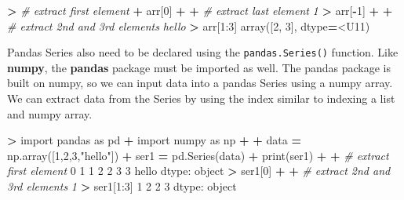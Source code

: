 \documentclass[
]{book}
\newenvironment{Shaded}{\begin{snugshade}}{\end{snugshade}}
\newcommand{\BuiltInTok}[1]{#1}
\newcommand{\CommentTok}[1]{\textcolor[rgb]{0.56,0.35,0.01}{\textit{#1}}}
\newcommand{\DecValTok}[1]{\textcolor[rgb]{0.00,0.00,0.81}{#1}}
\newcommand{\ImportTok}[1]{#1}
\newcommand{\NormalTok}[1]{#1}
\newcommand{\OperatorTok}[1]{\textcolor[rgb]{0.81,0.36,0.00}{\textbf{#1}}}
\newcommand{\StringTok}[1]{\textcolor[rgb]{0.31,0.60,0.02}{#1}}
\begin{document}
\begin{Shaded}
\begin{Highlighting}[]
\OperatorTok{\textgreater{}} \CommentTok{\# extract first element }
\OperatorTok{+}\NormalTok{ arr[}\DecValTok{0}\NormalTok{]}
\OperatorTok{+} 
\OperatorTok{+} \CommentTok{\# extract last element}
\CommentTok{\textquotesingle{}1\textquotesingle{}}
\OperatorTok{\textgreater{}}\NormalTok{ arr[}\OperatorTok{{-}}\DecValTok{1}\NormalTok{]}
\OperatorTok{+} 
\OperatorTok{+} \CommentTok{\# extract 2nd and 3rd elements}
\CommentTok{\textquotesingle{}hello\textquotesingle{}}
\OperatorTok{\textgreater{}}\NormalTok{ arr[}\DecValTok{1}\NormalTok{:}\DecValTok{3}\NormalTok{]}
\NormalTok{array([}\StringTok{\textquotesingle{}2\textquotesingle{}}\NormalTok{, }\StringTok{\textquotesingle{}3\textquotesingle{}}\NormalTok{], dtype}\OperatorTok{=}\StringTok{\textquotesingle{}\textless{}U11\textquotesingle{}}\NormalTok{)}
\end{Highlighting}
\end{Shaded}

Pandas Series also need to be declared using the \texttt{pandas.Series()} function. Like \textbf{numpy}, the \textbf{pandas} package must be imported as well. The pandas package is built on numpy, so we can input data into a pandas Series using a numpy array. We can extract data from the Series by using the index similar to indexing a list and numpy array.

\begin{Shaded}
\begin{Highlighting}[]
\OperatorTok{\textgreater{}} \ImportTok{import}\NormalTok{ pandas }\ImportTok{as}\NormalTok{ pd }
\OperatorTok{+} \ImportTok{import}\NormalTok{ numpy }\ImportTok{as}\NormalTok{ np}
\OperatorTok{+} 
\OperatorTok{+}\NormalTok{ data }\OperatorTok{=}\NormalTok{ np.array([}\DecValTok{1}\NormalTok{,}\DecValTok{2}\NormalTok{,}\DecValTok{3}\NormalTok{,}\StringTok{"hello"}\NormalTok{])}
\OperatorTok{+}\NormalTok{ ser1 }\OperatorTok{=}\NormalTok{ pd.Series(data)}
\OperatorTok{+} \BuiltInTok{print}\NormalTok{(ser1)}
\OperatorTok{+} 
\OperatorTok{+} \CommentTok{\# extract first element }
\DecValTok{0}        \DecValTok{1}
\DecValTok{1}        \DecValTok{2}
\DecValTok{2}        \DecValTok{3}
\DecValTok{3}\NormalTok{    hello}
\NormalTok{dtype: }\BuiltInTok{object}
\OperatorTok{\textgreater{}}\NormalTok{ ser1[}\DecValTok{0}\NormalTok{]}
\OperatorTok{+} 
\OperatorTok{+} \CommentTok{\# extract 2nd and 3rd elements }
\CommentTok{\textquotesingle{}1\textquotesingle{}}
\OperatorTok{\textgreater{}}\NormalTok{ ser1[}\DecValTok{1}\NormalTok{:}\DecValTok{3}\NormalTok{]}
\DecValTok{1}    \DecValTok{2}
\DecValTok{2}    \DecValTok{3}
\NormalTok{dtype: }\BuiltInTok{object}
\end{Highlighting}
\end{Shaded}
\end{document}
